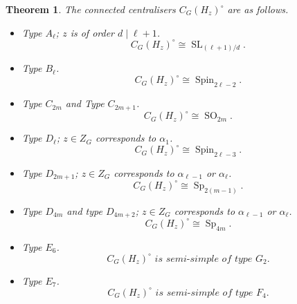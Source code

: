 \documentclass[11pt,oneside,dvipsnames]{amsart}
\theoremstyle{plain}
\newtheorem{Thm}{Theorem}
\theoremstyle{definition}
\theoremstyle{named}
\DeclareMathOperator{\SL}{SL}
\DeclareMathOperator{\SO}{SO}
\DeclareMathOperator{\Sp}{Sp}
\DeclareMathOperator{\Spin}{Spin}
\begin{document}
\begin{Thm}\label{Thm-Cent-H_z}
The connected centralisers $C_G(H_z)^{\circ}$ are as follows.
\begin{itemize}
\item Type $A_{\ell}$; $z$ is of order $d\mid \ell+1$.
$$
C_G(H_z)^{\circ}\cong\SL_{(\ell+1)/d}.
$$
\item Type $B_{\ell}$. 
$$
C_G(H_z)^{\circ}\cong\Spin_{2\ell-2}.
$$
\item Type $C_{2m}$ and Type $C_{2m+1}$. 
$$
C_G(H_z)^{\circ}\cong\SO_{2m}.
$$
\item Type $D_{\ell}$; $z\in Z_G$ corresponds to $\alpha_1$. 
$$
C_G(H_z)^{\circ}\cong\Spin_{2\ell-3}.
$$
\item Type $D_{2m+1}$; $z\in Z_G$ corresponds to $\alpha_{\ell-1}$ or $\alpha_{\ell}$. 
$$
C_G(H_z)^{\circ}\cong\Sp_{2(m-1)}.
$$
\item Type $D_{4m}$ and type $D_{4m+2}$; $z\in Z_G$ corresponds to $\alpha_{\ell-1}$ or $\alpha_{\ell}$. 
$$
C_G(H_z)^{\circ}\cong\Sp_{4m}.
$$
\item Type $E_6$. 
$$
C_G(H_z)^{\circ} \textit{ is semi-simple of type $G_2$.}
$$
\item Type $E_7$. 
$$
C_G(H_z)^{\circ} \textit{ is semi-simple of type $F_4$.}
$$
\end{itemize}
\end{Thm}
\end{document}
